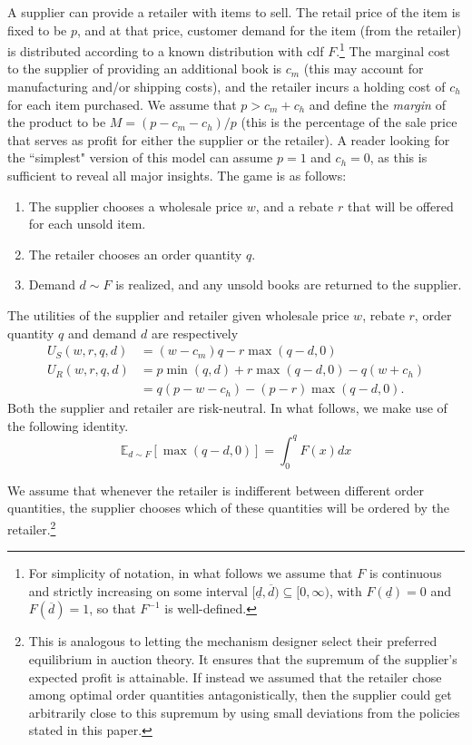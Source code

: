 \documentclass[11pt, oneside,margin=1in]{article}   	%
\newcommand{\E}{\mathbb{E}}
\begin{document}
A supplier can provide a retailer with items to sell. The retail price of the item is fixed to be $p$, and at that price, customer demand for the item (from the retailer) is distributed according to a known distribution with cdf $F$.\footnote{For simplicity of notation, in what follows we assume that $F$ is continuous and strictly increasing on some interval $[\underline{d},\overline{d}) \subseteq [0,\infty)$, with $F(\underline{d}) = 0$ and $F(\overline{d}) = 1$, so that $F^{-1}$ is well-defined.} The marginal cost to the supplier of providing an additional book is $c_m$ (this may account for manufacturing and/or shipping costs), and the retailer incurs a holding cost of $c_h$ for each item purchased. We assume that $p > c_m + c_h$ and define the {\em margin} of the product to be $M = (p - c_m-c_h)/p$ (this is the percentage of the sale price that serves as profit for either the supplier or the retailer). A reader looking for the ``simplest" version of this model can assume $p = 1$ and $c_h = 0$, as this is sufficient to reveal all major insights. The game is as follows:
\begin{enumerate}
\item The supplier chooses a wholesale price $w$, and a rebate $r$ that will be offered for each unsold item.
\item The retailer chooses an order quantity $q$.
\item Demand $d \sim F$ is realized, and any unsold books are returned to the supplier.
\end{enumerate}
The utilities of the supplier and retailer given wholesale price $w$, rebate $r$, order quantity $q$ and demand $d$ are respectively
\begin{align*}
U_S(w,r,q,d) & = (w - c_m) q - r \max(q-d,0)\\
U_R(w,r,q,d) & = p \min(q,d) + r \max(q-d,0) - q(w+c_h) \\
 & = q(p - w - c_h)  - (p-r) \max(q-d,0).
\end{align*}
Both the supplier and retailer are risk-neutral. In what follows, we make use of the following identity.
\begin{equation} \E_{d \sim F} [\max(q-d,0)] = \int_0^q F(x) dx \end{equation}

We assume that whenever the retailer is indifferent between different order quantities, the supplier chooses which of these quantities will be ordered by the retailer.\footnote{This is analogous to letting the mechanism designer select their preferred equilibrium in auction theory. It ensures that the supremum of the supplier's expected profit is attainable. If instead we assumed that the retailer chose among optimal order quantities antagonistically, then the supplier could get arbitrarily close to this supremum by using small deviations from the policies stated in this paper.}
\end{document}
